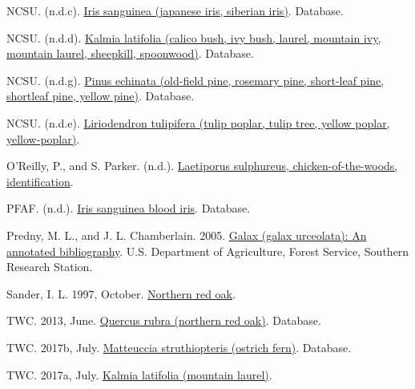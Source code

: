 \documentclass[
]{article}
\newlength{\cslhangindent}
\newlength{\cslentryspacingunit} %
\newenvironment{CSLReferences}[2] %
 {%
  \setlength{\parindent}{0pt}
  \ifodd #1
  \let\oldpar\par
  \def\par{\hangindent=\cslhangindent\oldpar}
  \fi
  \setlength{\parskip}{#2\cslentryspacingunit}
 }%
 {}
\begin{document}
\begin{CSLReferences}{1}{0}
\leavevmode{}%
NCSU. (n.d.c). \href{https://plants.ces.ncsu.edu/plants/iris-sanguinea/}{Iris sanguinea (japanese iris, siberian iris)}. Database.

\leavevmode{}%
NCSU. (n.d.d). \href{https://plants.ces.ncsu.edu/plants/kalmia-latifolia/}{Kalmia latifolia (calico bush, ivy bush, laurel, mountain ivy, mountain laurel, sheepkill, spoonwood)}. Database.

\leavevmode{}%
NCSU. (n.d.g). \href{https://plants.ces.ncsu.edu/plants/pinus-echinata/}{Pinus echinata (old-field pine, rosemary pine, short-leaf pine, shortleaf pine, yellow pine)}. Database.

\leavevmode{}%
NCSU. (n.d.e). \href{https://plants.ces.ncsu.edu/plants/liriodendron-tulipifera/}{Liriodendron tulipifera (tulip poplar, tulip tree, yellow poplar, yellow-poplar)}.

\leavevmode{}%
O'Reilly, P., and S. Parker. (n.d.). \href{https://www.first-nature.com/fungi/laetiporus-sulphureus.php}{Laetiporus sulphureus, chicken-of-the-woods, identification}.

\leavevmode{}%
PFAF. (n.d.). \href{https://pfaf.org/user/Plant.aspx?LatinName=Iris+sanguinea}{Iris sanguinea blood iris}. Database.

\leavevmode{}%
Predny, M. L., and J. L. Chamberlain. 2005. \href{https://www.srs.fs.usda.gov/pubs/gtr/gtr_srs087.pdf}{Galax (galax urceolata): An annotated bibliography}. U.S. Department of Agriculture, Forest Service, Southern Research Station.

\leavevmode{}%
Sander, I. L. 1997, October. \href{https://www.srs.fs.usda.gov/pubs/misc/ag_654/volume_2/quercus/rubra.htm}{Northern red oak}.

\leavevmode{}%
TWC. 2013, June. \href{https://www.wildflower.org/plants/result.php?id_plant=quru}{Quercus rubra (northern red oak)}. Database.

\leavevmode{}%
TWC. 2017b, July. \href{https://www.wildflower.org/plants/result.php?id_plant=MAST}{Matteuccia struthiopteris (ostrich fern)}. Database.

\leavevmode{}%
TWC. 2017a, July. \href{https://www.wildflower.org/plants/result.php?id_plant=KALA}{Kalmia latifolia (mountain laurel)}.


\end{CSLReferences}
\end{document}
